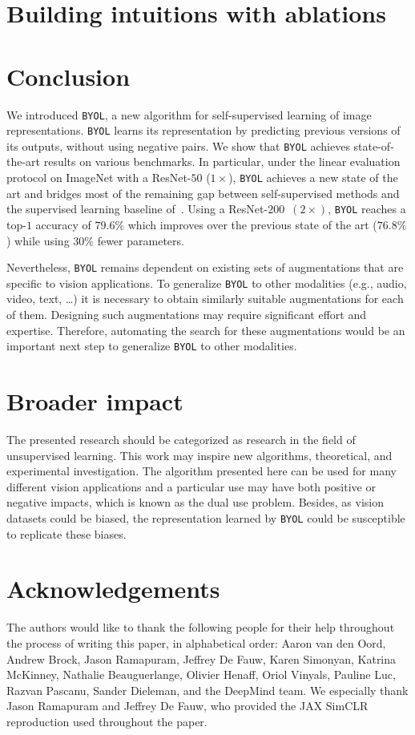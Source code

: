 \documentclass{article}
\newcommand{\algo}{\texttt{BYOL}\xspace}
\begin{document}
\section{Building intuitions with ablations}
\label{sec:ablation}


\section{Conclusion}
\label{sec:conclusion}
We introduced \algo, a new algorithm for self-supervised learning of image representations.
\algo learns its representation by predicting previous versions of its outputs, without using negative pairs. We show that \algo achieves state-of-the-art results on various benchmarks. In particular, under the linear evaluation protocol on ImageNet with a ResNet-$50$ ($1 \times$), \algo achieves a new state of the art and bridges most of the remaining gap between self-supervised methods and the supervised learning baseline of~\cite{SimCLR}. Using a ResNet-$200$~$(2\times)$, \algo reaches a top-$1$ accuracy of $79.6\%$  which improves over the previous state of the art ($76.8\%$) while using $30\%$ fewer parameters. 

Nevertheless, \algo remains dependent on existing sets of augmentations that are specific to vision applications. 
To generalize \algo to other modalities (e.g., audio, video, text, \dots) it is necessary to obtain similarly suitable augmentations for each of them. 
Designing such augmentations may require significant effort and expertise. 
Therefore, automating the search for these augmentations would be an important next step to generalize \algo to other modalities.

\clearpage

\section*{Broader impact}
The presented research should be categorized as research in the field of unsupervised learning. This work may inspire new algorithms, theoretical, and experimental investigation. The algorithm presented here can be used for many different vision applications and a particular use may have both positive or negative impacts, which is known as the dual use problem. Besides, as vision datasets could be biased, the representation learned by \algo could be susceptible to replicate these biases.


\section*{Acknowledgements}
The authors would like to thank the following people for their help throughout the process of writing this paper, in alphabetical order: Aaron van den Oord, Andrew Brock, Jason Ramapuram, Jeffrey De Fauw, Karen Simonyan, Katrina McKinney, Nathalie Beauguerlange, Olivier Henaff, Oriol Vinyals, Pauline Luc, Razvan Pascanu, Sander Dieleman, and the DeepMind team. We especially thank Jason Ramapuram and Jeffrey De Fauw, who provided the JAX SimCLR reproduction used throughout the paper.
\end{document}
